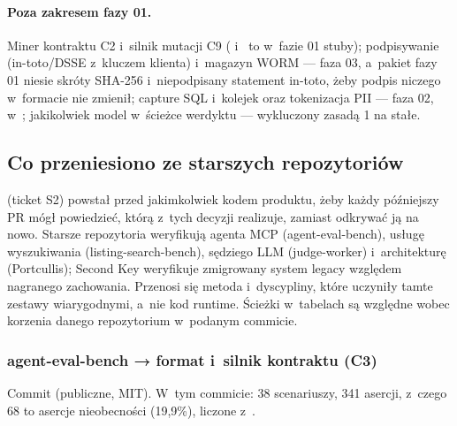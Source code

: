 \paragraph{Poza zakresem fazy 01.} Miner kontraktu C2 i~silnik mutacji C9 (
i~ to w~fazie 01 stuby); podpisywanie (in-toto/DSSE z~kluczem klienta) i~magazyn WORM --- faza 03, a~pakiet fazy 01 niesie skróty SHA-256 i~niepodpisany statement
in-toto, żeby podpis niczego w~formacie nie zmienił; capture SQL i~kolejek oraz tokenizacja
PII --- faza 02, w~; jakikolwiek model w~ścieżce
werdyktu --- wykluczony zasadą 1 na stałe.


\subsection{Co przeniesiono ze starszych repozytoriów}\label{sec:rdzen-referencje}

 (ticket S2) powstał przed jakimkolwiek kodem produktu, żeby
każdy późniejszy PR mógł powiedzieć, którą z~tych decyzji realizuje, zamiast odkrywać ją na
nowo.  Starsze repozytoria
weryfikują agenta MCP (agent-eval-bench), usługę wyszukiwania (listing-search-bench),
sędziego LLM (judge-worker) i~architekturę (Portcullis); Second Key weryfikuje zmigrowany
system legacy względem nagranego zachowania. Przenosi się metoda i~dyscypliny, które
uczyniły tamte zestawy wiarygodnymi, a~nie kod runtime. Ścieżki w~tabelach są względne
wobec korzenia danego repozytorium w~podanym commicie.

\subsubsection{agent-eval-bench → format i~silnik kontraktu (C3)}

Commit  (publiczne, MIT). W~tym commicie: 38 scenariuszy, 341 asercji, z~czego 68 to asercje nieobecności (19,9\%), liczone z~.

